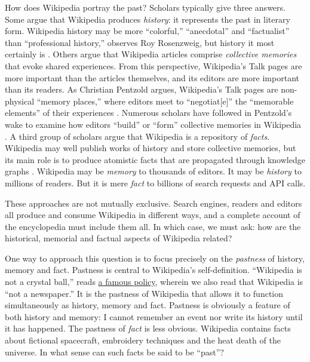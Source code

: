 \documentclass[Royal,times,sageh]{sagej}
\begin{document}
How does Wikipedia portray the past? Scholars typically give three
answers. Some argue that Wikipedia produces \emph{history}: it
represents the past in literary form. Wikipedia history may be more
``colorful,'' ``anecdotal'' and ``factualist'' than ``professional
history,'' observes Roy Rosenzweig, but history it most certainly is
\citep[p.~142]{rosenzweig_can_2006}. Others argue that Wikipedia
articles comprise \emph{collective memories} that evoke shared
experiences. From this perspective, Wikipedia's Talk pages are more
important than the articles themselves, and its editors are more
important than its readers. As Christian Pentzold argues, Wikipedia's
Talk pages are non-physical ``memory places,'' where editors meet to
``negotiat{[}e{]}'' the ``memorable elements'' of their experiences
\citep[p.~264]{pentzold_fixing_2009}. Numerous scholars have followed in
Pentzold's wake to examine how editors ``build'' or ``form'' collective
memories in Wikipedia
\citep{ferron_collective_2011, ferron_arab_2011, porter_visual_2020}. A
third group of scholars argue that Wikipedia is a repository of
\emph{facts}. Wikipedia may well publish works of history and store
collective memories, but its main role is to produce atomistic facts
that are propagated through knowledge graphs
\citep{ford_rise_2020, ford_writing_2022}. Wikipedia may be
\emph{memory} to thousands of editors. It may be \emph{history} to
millions of readers. But it is mere \emph{fact} to billions of search
requests and API calls.

These approaches are not mutually exclusive. Search engines, readers and
editors all produce and consume Wikipedia in different ways, and a
complete account of the encyclopedia must include them all. In which
case, we must ask: how are the historical, memorial and factual aspects
of Wikipedia related?

One way to approach this question is to focus precisely on the
\emph{pastness} of history, memory and fact. Pastness is central to
Wikipedia's self-definition. ``Wikipedia is not a crystal ball,'' reads
\href{https://en.wikipedia.org/wiki/WP:NOT}{a famous policy}, wherein we
also read that Wikipedia is ``not a newspaper.'' It is the pastness of
Wikipedia that allows it to function simultaneously as history, memory
and fact. Pastness is obviously a feature of both history and memory: I
cannot remember an event nor write its history until it has happened.
The pastness of \emph{fact} is less obvious. Wikipedia contains facts
about fictional spacecraft, embroidery techniques and the heat death of
the universe. In what sense can such facts be said to be ``past''?
\end{document}
